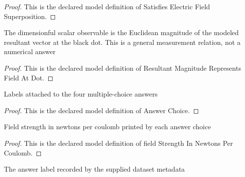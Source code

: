 \begin{proof}
  This is the declared model definition of Satisfies Electric Field Superposition.
\end{proof}
\begin{definition}
  \label{def:physics:phyx-mini-0913:phyxminiproblems-problemphyxmini0913-resultantmagnituderepresentsfieldatdot}
  The dimensionful scalar observable is the Euclidean magnitude of the modeled resultant vector at the black dot. This is a general measurement relation, not a numerical answer
\end{definition}
\begin{proof}
  This is the declared model definition of Resultant Magnitude Represents Field At Dot.
\end{proof}
\begin{definition}
  \label{def:physics:phyx-mini-0913:phyxminiproblems-problemphyxmini0913-answerchoice}
  Labels attached to the four multiple-choice answers
\end{definition}
\begin{proof}
  This is the declared model definition of Answer Choice.
\end{proof}
\begin{definition}
  \label{def:physics:phyx-mini-0913:phyxminiproblems-problemphyxmini0913-answerchoice-fieldstrengthinnewtonspercoulomb}
  Field strength in newtons per coulomb printed by each answer choice
\end{definition}
\begin{proof}
  This is the declared model definition of field Strength In Newtons Per Coulomb.
\end{proof}
\begin{definition}
  \label{def:physics:phyx-mini-0913:phyxminiproblems-problemphyxmini0913-recordeddatasetanswer}
  The answer label recorded by the supplied dataset metadata
\end{definition}
